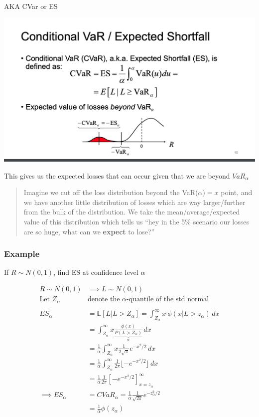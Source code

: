 \documentclass[
  oneside]{book}
\begin{document}
AKA CVar or ES

\includegraphics{Notes/Obsidian-Attachments/7-Risk-Management-3.png}

This gives us the expected losses that can occur given that we are beyond \(VaR_{\alpha}\)

\begin{quote}
Imagine we cut off the loss distribution beyond the VaR(\(\alpha\))\(=x\) point, and we have another little distribution of losses which are way larger/further from the bulk of the distribution.
We take the mean/average/expected value of this distribution which tells us ``hey in the 5\% scenario our losses are so huge, what can we \textbf{expect} to lose?''
\end{quote}

\hypertarget{example-2}{%
\subsubsection{Example}\label{example-2}}

If \(R\sim N(0,1)\), find ES at confidence level \(\alpha\)

\[
\begin{aligned}
R\sim N(0,1) &\implies L \sim N(0,1)\\
\text{Let } Z_{\alpha} &\text{denote the } \alpha \text{-quantile of the std normal}\\
\\
ES_{\alpha} &= \mathbb{E}[L|L>Z_{\alpha}] = \int ^{\infty}_{Z_{\alpha}} x \ \phi(x| L> z_{\alpha}) \, dx\\
&= \int ^{\infty}_{Z_{\alpha}} x \frac{\phi(x)}{\underbrace{ P(L > Z_{\alpha}) }_{ \alpha }}\, dx \\
&= \frac{1}{\alpha}\int ^{\infty}_{Z_{\alpha}} x \frac{1}{2\sqrt{ \pi }}e^{-x^{2}/2}\, dx \\
&= \frac{1}{\alpha}  \int ^{\infty}_{Z_{\alpha}}\frac{1}{2\pi} \lfloor-e^{-x^{2}/2}\rfloor  \, dx \\
&= \frac{1}{\alpha} \frac{1}{2\pi} \left[-e^{-x^{2}/2}\right]^{\infty}_{x=z_{\alpha}}\\
\implies ES_{\alpha} &= CVaR_{\alpha} = \frac{1}{\alpha}\frac{1}{\sqrt{ 2\pi }}e^{-z_{\alpha}^{2}/2}\\
&= \frac{1}{\alpha} \phi(z_{\alpha})
\end{aligned}
\]
\end{document}
